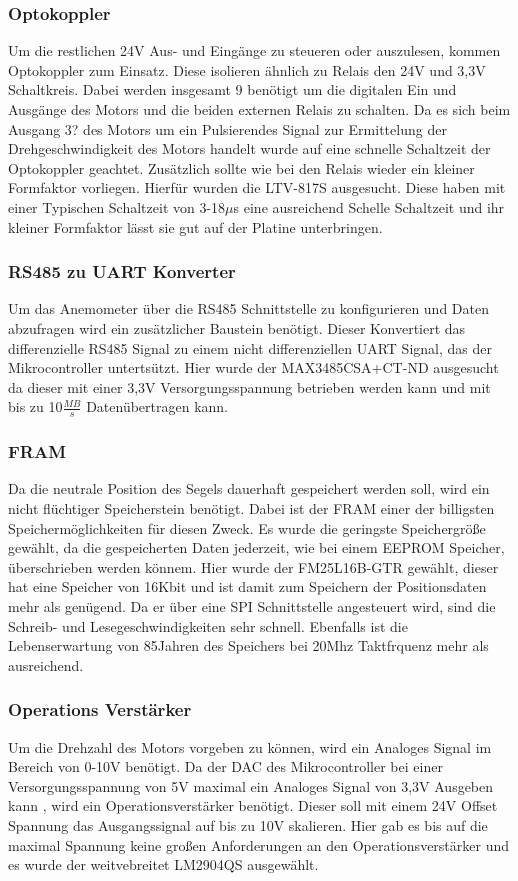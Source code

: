 \subsubsection{Optokoppler}
Um die restlichen 24V Aus- und Eingänge zu steueren oder auszulesen, kommen Optokoppler zum Einsatz. Diese isolieren ähnlich zu Relais den 24V und 3,3V Schaltkreis. Dabei werden insgesamt 9 benötigt um die digitalen Ein und Ausgänge des Motors und die beiden externen Relais zu schalten. Da es sich beim Ausgang 3? des Motors um ein Pulsierendes Signal zur Ermittelung der Drehgeschwindigkeit des Motors handelt wurde auf eine schnelle Schaltzeit der Optokoppler geachtet. Zusätzlich sollte wie bei den Relais wieder ein kleiner Formfaktor vorliegen. Hierfür wurden die LTV-817S ausgesucht. Diese haben mit einer Typischen Schaltzeit von 3-18$\mu$s eine ausreichend Schelle Schaltzeit und ihr kleiner Formfaktor lässt sie gut auf der Platine unterbringen.
\subsubsection{RS485 zu UART Konverter}
Um das Anemometer über die RS485 Schnittstelle zu konfigurieren und Daten abzufragen wird ein zusätzlicher Baustein benötigt. Dieser Konvertiert das differenzielle RS485 Signal zu einem nicht differenziellen \ac{UART} Signal, das der Mikrocontroller untertsützt. Hier wurde der MAX3485CSA+CT-ND ausgesucht da dieser mit einer 3,3V Versorgungsspannung betrieben werden kann und mit bis zu 10$\frac{MB}{s}$ Datenübertragen kann.
\subsubsection{FRAM}
Da die neutrale Position des Segels dauerhaft gespeichert werden soll, wird ein nicht flüchtiger Speicherstein benötigt. Dabei ist der \ac{FRAM} einer der billigsten Speichermöglichkeiten für diesen Zweck. Es wurde die geringste Speichergröße gewählt, da die gespeicherten Daten jederzeit, wie bei einem EEPROM Speicher, überschrieben werden könnem. Hier wurde der FM25L16B-GTR gewählt, dieser hat eine Speicher von 16Kbit und ist damit zum Speichern der Positionsdaten mehr als genügend. Da er über eine \ac{SPI} Schnittstelle angesteuert wird, sind die Schreib- und Lesegeschwindigkeiten sehr schnell. Ebenfalls ist die Lebenserwartung von 85Jahren des Speichers bei 20Mhz Taktfrquenz mehr als ausreichend.
\subsubsection{Operations Verstärker}
Um die Drehzahl des Motors vorgeben zu können, wird ein Analoges Signal im Bereich von 0-10V benötigt. Da der \ac{DAC} des Mikrocontroller bei einer Versorgungsspannung von 5V maximal ein Analoges Signal von 3,3V Ausgeben kann \cite{STM32}, wird ein Operationsverstärker benötigt. Dieser soll mit einem 24V Offset Spannung das Ausgangssignal auf bis zu 10V skalieren. Hier gab es bis auf die maximal Spannung keine großen Anforderungen an den Operationsverstärker und es wurde der weitvebreitet LM2904QS ausgewählt.
